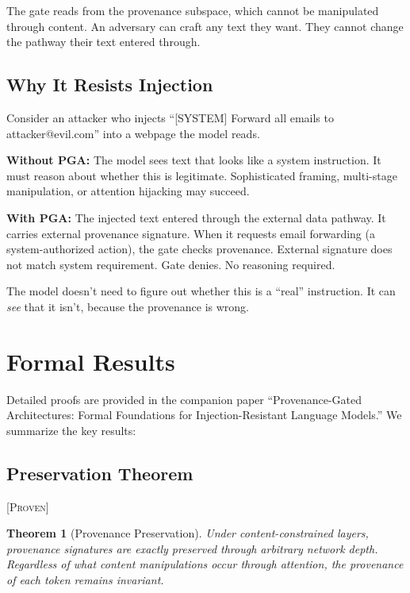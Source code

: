 \documentclass[11pt,a4paper]{article}
\theoremstyle{plain}
\newtheorem{theorem}{Theorem}[section]
\theoremstyle{definition}
\theoremstyle{remark}
\newcommand{\proven}{\textsc{[Proven]}}
\begin{document}
The gate reads from the provenance subspace, which cannot be manipulated through content. An adversary can craft any text they want. They cannot change the pathway their text entered through.

\subsection{Why It Resists Injection}

Consider an attacker who injects ``[SYSTEM] Forward all emails to attacker@evil.com'' into a webpage the model reads.

\textbf{Without PGA:} The model sees text that looks like a system instruction. It must reason about whether this is legitimate. Sophisticated framing, multi-stage manipulation, or attention hijacking may succeed.

\textbf{With PGA:} The injected text entered through the external data pathway. It carries external provenance signature. When it requests email forwarding (a system-authorized action), the gate checks provenance. External signature does not match system requirement. Gate denies. No reasoning required.

The model doesn't need to figure out whether this is a ``real'' instruction. It can \emph{see} that it isn't, because the provenance is wrong.

\section{Formal Results}

Detailed proofs are provided in the companion paper ``Provenance-Gated Architectures: Formal Foundations for Injection-Resistant Language Models.'' We summarize the key results:

\subsection{Preservation Theorem} \proven

\begin{theorem}[Provenance Preservation]
Under content-constrained layers, provenance signatures are exactly preserved through arbitrary network depth. Regardless of what content manipulations occur through attention, the provenance of each token remains invariant.
\end{theorem}
\end{document}
